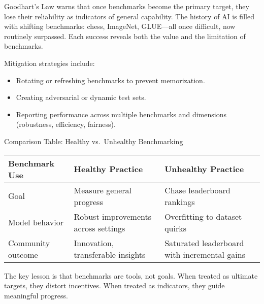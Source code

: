\documentclass[
  letterpaper,
  DIV=11,
  numbers=noendperiod]{scrreprt}
\providecommand{\tightlist}{%
  \setlength{\itemsep}{0pt}\setlength{\parskip}{0pt}}
\begin{document}
Goodhart's Law warns that once benchmarks become the primary target,
they lose their reliability as indicators of general capability. The
history of AI is filled with shifting benchmarks: chess, ImageNet,
GLUE---all once difficult, now routinely surpassed. Each success reveals
both the value and the limitation of benchmarks.

Mitigation strategies include:

\begin{itemize}
\tightlist
\item
  Rotating or refreshing benchmarks to prevent memorization.
\item
  Creating adversarial or dynamic test sets.
\item
  Reporting performance across multiple benchmarks and dimensions
  (robustness, efficiency, fairness).
\end{itemize}

Comparison Table: Healthy vs.~Unhealthy Benchmarking

\begin{longtable}[]{@{}
  >{\raggedright\arraybackslash}p{}
  >{\raggedright\arraybackslash}p{}
  >{\raggedright\arraybackslash}p{}@{}}
\toprule\noalign{}
\begin{minipage}[b]{\linewidth}\raggedright
Benchmark Use
\end{minipage} & \begin{minipage}[b]{\linewidth}\raggedright
Healthy Practice
\end{minipage} & \begin{minipage}[b]{\linewidth}\raggedright
Unhealthy Practice
\end{minipage} \\
\midrule\noalign{}
\endhead
\bottomrule\noalign{}
\endlastfoot
Goal & Measure general progress & Chase leaderboard rankings \\
Model behavior & Robust improvements across settings & Overfitting to
dataset quirks \\
Community outcome & Innovation, transferable insights & Saturated
leaderboard with incremental gains \\
\end{longtable}

The key lesson is that benchmarks are tools, not goals. When treated as
ultimate targets, they distort incentives. When treated as indicators,
they guide meaningful progress.
\end{document}
